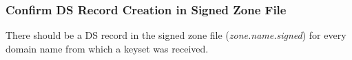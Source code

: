 




\subsubsection{Confirm DS Record Creation in Signed Zone File}

There should be a DS record in the signed zone file ({\it zone.name.signed})
for every domain name from which a keyset was received.


\label{signzone-deleg-last}

